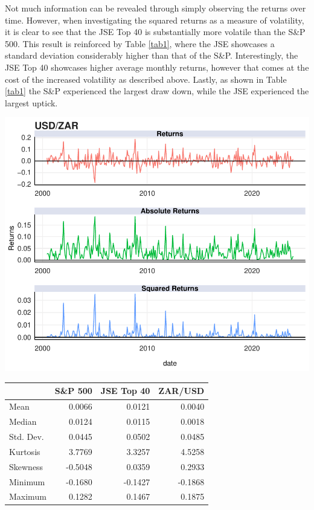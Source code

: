 \documentclass[11pt,preprint, authoryear]{elsarticle}
\let\origfigure\figure
\let\endorigfigure\endfigure
\renewenvironment{figure}[1][2] {
    \expandafter\origfigure\expandafter[H]
} {
    \endorigfigure
}
\let\origtable\table
\let\endorigtable\endtable
\renewenvironment{table}[1][2] {
    \expandafter\origtable\expandafter[H]
} {
    \endorigtable
}
\numberwithin{equation}{section}
\numberwithin{figure}{section}
\numberwithin{table}{section}
\begin{document}
Not much information can be revealed through simply observing the
returns over time. However, when investigating the squared returns as a
measure of volatility, it is clear to see that the JSE Top 40 is
substantially more volatile than the S\&P 500. This result is reinforced
by Table \ref{tab1}, where the JSE showcases a standard deviation
considerably higher than that of the S\&P. Interestingly, the JSE Top 40
showcases higher average monthly returns, however that comes at the cost
of the increased volatility as described above. Lastly, as shown in
Table \ref{tab1} the S\&P experienced the largest draw down, while the
JSE experienced the largest uptick.

\begin{figure}[H]

{\centering \includegraphics{Template_files/figure-latex/Figure3-1} 

}

\caption{ZAR/USD Returns \label{Figure3}}\label{fig:Figure3}
\end{figure}

\begin{table}[H]
\centering
\caption{Summary Statistics \label{tab1}} 
\begin{tabular}{lrrr}
  \hline
 & S\&P 500 & JSE Top 40 & ZAR/USD \\ 
  \hline
Mean & 0.0066 & 0.0121 & 0.0040 \\ 
  Median & 0.0124 & 0.0115 & 0.0018 \\ 
  Std. Dev. & 0.0445 & 0.0502 & 0.0485 \\ 
  Kurtosis & 3.7769 & 3.3257 & 4.5258 \\ 
  Skewness & -0.5048 & 0.0359 & 0.2933 \\ 
  Minimum & -0.1680 & -0.1427 & -0.1868 \\ 
  Maximum & 0.1282 & 0.1467 & 0.1875 \\ 
   \hline
\end{tabular}
\end{table}
\end{document}
